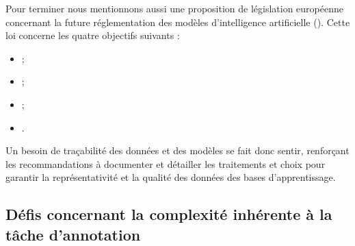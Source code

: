			\begin{leftBarInformation}
				Pour terminer nous mentionnons aussi une proposition de législation européenne concernant la future réglementation des modèles d'intelligence artificielle (\cite{european-commission:2021:proposal-regulation-european}).
				Cette loi concerne les quatre objectifs suivants :
				\begin{itemize}
					\item {} ;
					\item {} ;
					\item {} ;
					\item {}.
				\end{itemize}
				Un besoin de traçabilité des données et des modèles se fait donc sentir, renforçant les recommandations à documenter et détailler les traitements et choix pour garantir la représentativité et la qualité des données des bases d'apprentissage.
			\end{leftBarInformation}
		
		
	\subsection{Défis concernant la complexité inhérente à la tâche d'annotation}
	\label{section:2.3.2-DEFIS-ANNOTATION-ASPECT-COMPLEXITE}
	
